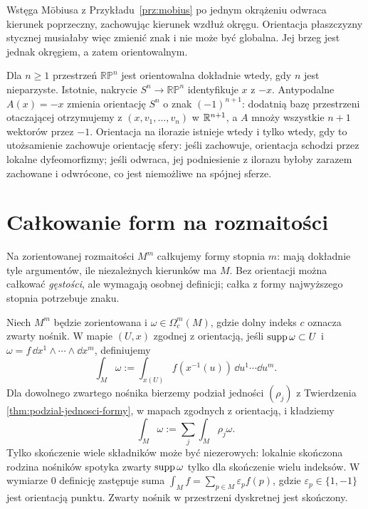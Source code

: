 \begin{przyklad}
Wstęga Möbiusa z Przykładu~\ref{prz:mobius}
po jednym okrążeniu odwraca
kierunek poprzeczny, zachowując kierunek
wzdłuż okręgu. Orientacja płaszczyzny stycznej
musiałaby więc zmienić znak i nie może być globalna.
Jej brzeg jest jednak okręgiem, a zatem orientowalnym.

Dla $n\geq1$ przestrzeń $\mathbb{RP}^n$ jest
orientowalna dokładnie wtedy, gdy $n$ jest nieparzyste.
Istotnie, nakrycie $S^n\to\mathbb{RP}^n$ identyfikuje
$x$ z $-x$. Antypodalne $A(x)=-x$ zmienia orientację
$S^n$ o znak $(-1)^{n+1}$: dodatnią bazę przestrzeni otaczającej
otrzymujemy z $(x,v_1,\ldots,v_n)$ w $\mathbb{R}^{n+1}$,
a $A$ mnoży wszystkie $n+1$ wektorów przez $-1$.
Orientacja na ilorazie istnieje wtedy i tylko wtedy,
gdy to utożsamienie zachowuje orientację sfery:
jeśli zachowuje, orientacja schodzi przez lokalne
dyfeomorfizmy; jeśli odwraca, jej podniesienie z
ilorazu byłoby zarazem zachowane i odwrócone, co
jest niemożliwe na spójnej sferze.
\end{przyklad}
\section{Całkowanie form na rozmaitości}
\label{sec:formy-calkowanie}

Na zorientowanej rozmaitości $M^m$ całkujemy formy
stopnia $m$: mają dokładnie tyle argumentów, ile
niezależnych kierunków ma $M$. Bez orientacji można
całkować \emph{gęstości}, ale wymagają osobnej definicji;
całka z formy najwyższego stopnia potrzebuje znaku.

\begin{definicja}
\label{def:calka-z-formy}
Niech $M^m$ będzie zorientowana i
$\omega\in\Omega_c^m(M)$, gdzie dolny indeks $c$
oznacza zwarty nośnik. W mapie $(U,x)$ zgodnej z
orientacją, jeśli $\operatorname{supp}\omega\subset U$ i
$\omega=f\,\dd x^1\wedge\cdots\wedge\dd x^m$,
definiujemy
\begin{equation}\label{eq:calka-lokalna}
 \int_M\omega:=\int_{x(U)} f(x^{-1}(u))\,\dd u^1\cdots\dd u^m.
\end{equation}
Dla dowolnego zwartego nośnika bierzemy podział
jedności $(\rho_j)$ z Twierdzenia
\ref{thm:podzial-jednosci-formy}, w mapach zgodnych
z orientacją, i kładziemy
\begin{equation}\label{eq:calka-globalna}
 \int_M\omega:=\sum_j\int_M\rho_j\omega.
\end{equation}
Tylko skończenie wiele składników może być niezerowych:
lokalnie skończona rodzina nośników spotyka zwarty
$\operatorname{supp}\omega$ tylko dla skończenie wielu indeksów.
W wymiarze $0$ definicję zastępuje suma
$\int_M f=\sum_{p\in M}\varepsilon_p f(p)$,
gdzie $\varepsilon_p\in\{1,-1\}$ jest orientacją punktu.
Zwarty nośnik w przestrzeni dyskretnej jest skończony.
\end{definicja}

